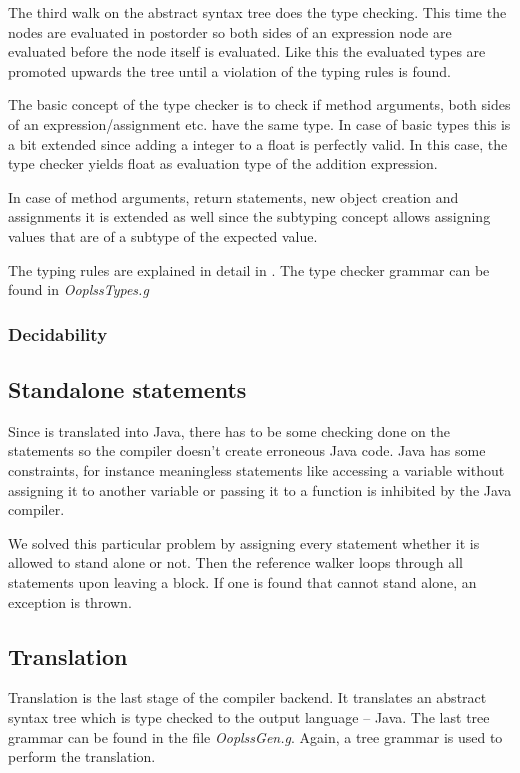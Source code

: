 The third walk on the abstract syntax tree does the type checking. This
time the nodes are evaluated in postorder so both sides of an expression
node are evaluated before the node itself is evaluated. Like this the
evaluated types are promoted upwards the tree until a violation of the
typing rules is found.

The basic concept of the type checker is to check if method arguments, 
both sides of an expression/assignment etc. have the same type. In case
of basic types this is a bit extended since adding a integer to a float 
is perfectly valid. In this case, the type checker yields float as evaluation
type of the addition expression.

In case of method arguments, return statements, new object creation 
and assignments it is extended as well since the subtyping concept 
allows assigning values that are of a subtype of the expected value.

The typing rules are explained in detail in . The
type checker grammar can be found in \emph{OoplssTypes.g}

\subsubsection{Decidability}

\subsection{Standalone statements}

Since \ooplss is translated into Java, there has to be some checking
done on the statements so the compiler doesn't create erroneous Java
code. Java has some constraints, for instance meaningless statements
like accessing a variable without assigning it to another variable
or passing it to a function is inhibited by the Java compiler.

We solved this particular problem by assigning every statement whether
it is allowed to stand alone or not. Then the reference walker loops 
through all statements upon leaving a block. If one is found that cannot
stand alone, an exception is thrown.

\subsection{Translation}
Translation is the last stage of the compiler backend. It
translates an abstract syntax tree which is type checked to the
output language -- Java. The last tree grammar can be found in the
file \emph{OoplssGen.g}. Again, a tree grammar is used to perform the
translation.

